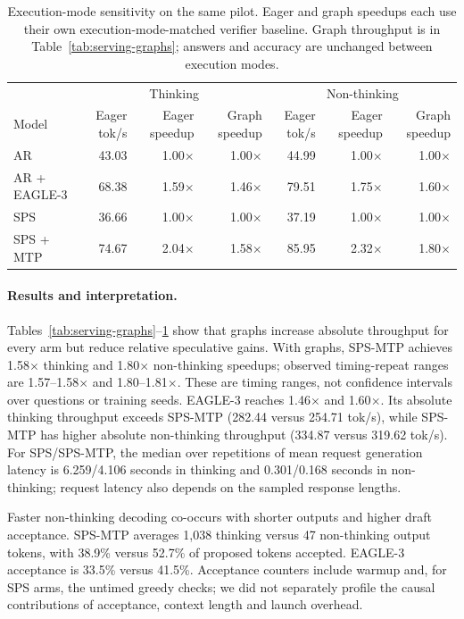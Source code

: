 \begin{table}[t]
\centering\small
\begin{tabular}{lrrrrrr}
\toprule
& \multicolumn{3}{c}{Thinking} & \multicolumn{3}{c}{Non-thinking}\\
Model & Eager tok/s & Eager speedup & Graph speedup & Eager tok/s & Eager speedup & Graph speedup\\
\midrule
AR & 43.03 & 1.00$\times$ & 1.00$\times$ & 44.99 & 1.00$\times$ & 1.00$\times$\\
AR + EAGLE-3 & 68.38 & 1.59$\times$ & 1.46$\times$ & 79.51 & 1.75$\times$ & 1.60$\times$\\
SPS & 36.66 & 1.00$\times$ & 1.00$\times$ & 37.19 & 1.00$\times$ & 1.00$\times$\\
SPS + MTP & 74.67 & 2.04$\times$ & 1.58$\times$ & 85.95 & 2.32$\times$ & 1.80$\times$\\
\bottomrule
\end{tabular}
\caption{Execution-mode sensitivity on the same pilot. Eager and graph speedups each use their own execution-mode-matched verifier baseline. Graph throughput is in Table~\ref{tab:serving-graphs}; answers and accuracy are unchanged between execution modes.}
\label{tab:serving-eager}
\end{table}

\paragraph{Results and interpretation.}
Tables~\ref{tab:serving-graphs}--\ref{tab:serving-eager} show that graphs increase absolute throughput for every arm but reduce relative speculative gains. With graphs, SPS-MTP achieves 1.58$\times$ thinking and 1.80$\times$ non-thinking speedups; observed timing-repeat ranges are 1.57--1.58$\times$ and 1.80--1.81$\times$. These are timing ranges, not confidence intervals over questions or training seeds. EAGLE-3 reaches 1.46$\times$ and 1.60$\times$. Its absolute thinking throughput exceeds SPS-MTP (282.44 versus 254.71 tok/s), while SPS-MTP has higher absolute non-thinking throughput (334.87 versus 319.62 tok/s). For SPS/SPS-MTP, the median over repetitions of mean request generation latency is 6.259/4.106 seconds in thinking and 0.301/0.168 seconds in non-thinking; request latency also depends on the sampled response lengths.

Faster non-thinking decoding co-occurs with shorter outputs and higher draft acceptance. SPS-MTP averages 1,038 thinking versus 47 non-thinking output tokens, with 38.9\% versus 52.7\% of proposed tokens accepted. EAGLE-3 acceptance is 33.5\% versus 41.5\%. Acceptance counters include warmup and, for SPS arms, the untimed greedy checks; we did not separately profile the causal contributions of acceptance, context length and launch overhead.

